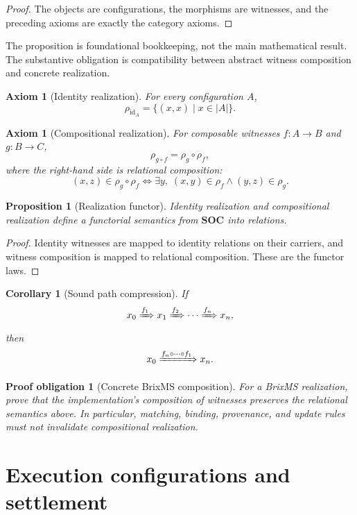 \documentclass[11pt]{article}
\newtheorem{axiom}[definition]{Axiom}
\newtheorem{proposition}[definition]{Proposition}
\newtheorem{corollary}[definition]{Corollary}
\newtheorem{obligation}[definition]{Proof obligation}
\theoremstyle{remark}
\newcommand{\id}{\mathrm{id}}
\newcommand{\realizes}[1]{\xRightarrow{#1}}
\newcommand{\carrier}[1]{\lvert #1 \rvert}
\begin{document}
\begin{proof}
The objects are configurations, the morphisms are witnesses, and the preceding
axioms are exactly the category axioms.
\end{proof}

The proposition is foundational bookkeeping, not the main mathematical result.
The substantive obligation is compatibility between abstract witness
composition and concrete realization.

\begin{axiom}[Identity realization]
For every configuration $A$,
\[
  \rho_{\id_A}
  =
  \{(x,x)\mid x\in\carrier{A}\}.
\]
\end{axiom}

\begin{axiom}[Compositional realization]
For composable witnesses $f:A\to B$ and $g:B\to C$,
\[
  \rho_{g\circ f}
  =
  \rho_g\circ\rho_f,
\]
where the right-hand side is relational composition:
\[
  (x,z)\in\rho_g\circ\rho_f
  \iff
  \exists y,\;(x,y)\in\rho_f\land(y,z)\in\rho_g.
\]
\end{axiom}

\begin{proposition}[Realization functor]
Identity realization and compositional realization define a functorial
semantics from $\mathbf{SOC}$ into relations.
\end{proposition}

\begin{proof}
Identity witnesses are mapped to identity relations on their carriers, and
witness composition is mapped to relational composition. These are the
functor laws.
\end{proof}

\begin{corollary}[Sound path compression]
If
\[
  x_0\realizes{f_1}x_1
  \realizes{f_2}\cdots
  \realizes{f_n}x_n,
\]
then
\[
  x_0
  \realizes{f_n\circ\cdots\circ f_1}
  x_n.
\]
\end{corollary}

\begin{obligation}[Concrete BrixMS composition]
For a BrixMS realization, prove that the implementation's composition of
witnesses preserves the relational semantics above. In particular, matching,
binding, provenance, and update rules must not invalidate compositional
realization.
\end{obligation}

\section{Execution configurations and settlement}
\end{document}
